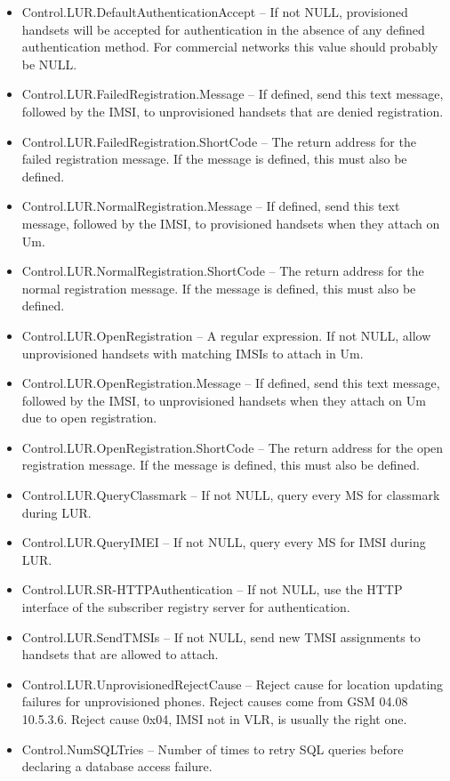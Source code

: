 \documentclass[11pt,openany]{book}
\begin{document}
\begin{itemize}
\item Control.LUR.DefaultAuthenticationAccept -- If not NULL, provisioned handsets will be accepted for authentication in the absence of any defined authentication method.  For commercial networks this value should probably be NULL.
\item Control.LUR.FailedRegistration.Message -- If defined, send this text message, followed by the IMSI, to unprovisioned handsets that are denied  registration.
\item Control.LUR.FailedRegistration.ShortCode -- The return address for the failed registration message.  If the message is defined, this must also be defined.
\item Control.LUR.NormalRegistration.Message -- If defined, send this text message, followed by the IMSI, to provisioned handsets when they attach on Um.
\item Control.LUR.NormalRegistration.ShortCode -- The return address for the normal registration message.  If the message is defined, this must also be defined.
\item Control.LUR.OpenRegistration -- A regular expression.  If not NULL, allow unprovisioned handsets with matching IMSIs to attach in Um.
\item Control.LUR.OpenRegistration.Message -- If defined, send this text message, followed by the IMSI, to unprovisioned handsets when they attach on Um due to open registration.
\item Control.LUR.OpenRegistration.ShortCode -- The return address for the open registration message.  If the message is defined, this must also be defined.
\item Control.LUR.QueryClassmark -- If not NULL, query every MS for classmark during LUR.
\item Control.LUR.QueryIMEI -- If not NULL, query every MS for IMSI during LUR.
\item Control.LUR.SR-HTTPAuthentication -- If not NULL, use the HTTP interface of the subscriber registry server for authentication.
\item Control.LUR.SendTMSIs -- If not NULL, send new TMSI assignments to handsets that are allowed to attach.
\item Control.LUR.UnprovisionedRejectCause -- Reject cause for location updating failures for unprovisioned phones.  Reject causes come from GSM 04.08 10.5.3.6.  Reject cause 0x04, IMSI not in VLR, is usually the right one.
\item Control.NumSQLTries -- Number of times to retry SQL queries before declaring a database access failure.

\end{itemize}
\end{document}
